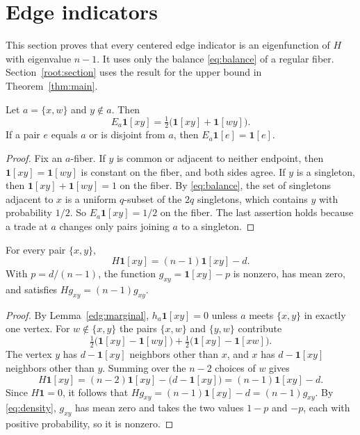 \section{Edge indicators}\label{edg:section}
This section proves that every centered edge indicator is an eigenfunction of
$H$ with eigenvalue $n-1$. It uses only the balance \eqref{eq:balance} of a
regular fiber. Section~\ref{root:section} uses the result for the upper bound
in Theorem~\ref{thm:main}.

\begin{lemma}\label{edg:marginal}
Let $a=\{x,w\}$ and $y\notin a$. Then
\[
 E_a\mathbf1[xy]=\tfrac12\bigl(\mathbf1[xy]+\mathbf1[wy]\bigr).
\]
If a pair $e$ equals $a$ or is disjoint from $a$, then
$E_a\mathbf1[e]=\mathbf1[e]$.
\end{lemma}

\begin{proof}
Fix an $a$-fiber. If $y$ is common or adjacent to neither endpoint, then
$\mathbf1[xy]=\mathbf1[wy]$ is constant on the fiber, and both sides agree. If
$y$ is a singleton, then $\mathbf1[xy]+\mathbf1[wy]=1$ on the fiber. By
\eqref{eq:balance}, the set of singletons adjacent to $x$ is a uniform
$q$-subset of the $2q$ singletons, which contains $y$ with probability $1/2$.
So $E_a\mathbf1[xy]=1/2$ on the fiber. The last assertion holds because a
trade at $a$ changes only pairs joining $a$ to a singleton.
\end{proof}

\begin{proposition}\label{edg:eigen}
For every pair $\{x,y\}$,
\[
 H\mathbf1[xy]=(n-1)\mathbf1[xy]-d .
\]
With $p=d/(n-1)$, the function $g_{xy}=\mathbf1[xy]-p$ is nonzero, has mean
zero, and satisfies $Hg_{xy}=(n-1)g_{xy}$.
\end{proposition}

\begin{proof}
By Lemma~\ref{edg:marginal}, $h_a\mathbf1[xy]=0$ unless $a$ meets $\{x,y\}$ in
exactly one vertex. For $w\notin\{x,y\}$ the pairs $\{x,w\}$ and $\{y,w\}$
contribute
\[
 \tfrac12\bigl(\mathbf1[xy]-\mathbf1[wy]\bigr)
 +\tfrac12\bigl(\mathbf1[xy]-\mathbf1[xw]\bigr).
\]
The vertex $y$ has $d-\mathbf1[xy]$ neighbors other than $x$, and $x$ has
$d-\mathbf1[xy]$ neighbors other than $y$. Summing over the $n-2$ choices of
$w$ gives
\[
 H\mathbf1[xy]=(n-2)\mathbf1[xy]-\bigl(d-\mathbf1[xy]\bigr)
 =(n-1)\mathbf1[xy]-d .
\]
Since $H\mathbf1=0$, it follows that $Hg_{xy}=(n-1)\mathbf1[xy]-d=(n-1)g_{xy}$.
By \eqref{eq:density}, $g_{xy}$ has mean zero and takes the two values $1-p$
and $-p$, each with positive probability, so it is nonzero.
\end{proof}

